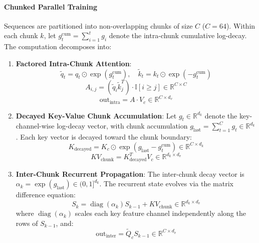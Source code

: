 \documentclass[10pt,twocolumn,letterpaper]{article}
\begin{document}
\paragraph{Chunked Parallel Training} Sequences are partitioned into non-overlapping chunks of size $C$ ($C=64$). Within each chunk $k$, let $g_t^{\text{cum}} = \sum_{i=1}^t g_i$ denote the intra-chunk cumulative log-decay. The computation decomposes into:
\begin{enumerate}
    \item \textbf{Factored Intra-Chunk Attention}:
    \begin{equation}
        \tilde{q}_t = q_t \odot \exp(g_t^{\text{cum}}), \quad \tilde{k}_t = k_t \odot \exp(-g_t^{\text{cum}})
    \end{equation}
    \begin{equation}
        A_{i, j} = (\tilde{q}_i \tilde{k}_j^T) \cdot \mathbb{I}[i \ge j] \in \mathbb{R}^{C \times C}
    \end{equation}
    \begin{equation}
        \text{out}_{\text{intra}} = A \cdot V_c \in \mathbb{R}^{C \times d_v}
    \end{equation}
    \item \textbf{Decayed Key-Value Chunk Accumulation}:
    Let $g_t \in \mathbb{R}^{d_k}$ denote the key-channel-wise log-decay vector, with chunk accumulation $g_{\text{last}} = \sum_{t=1}^C g_t \in \mathbb{R}^{d_k}$. Each key vector is decayed toward the chunk boundary:
    \begin{equation}
        K_{\text{decayed}} = K_c \odot \exp(g_{\text{last}} - g_t^{\text{cum}}) \in \mathbb{R}^{C \times d_k}
    \end{equation}
    \begin{equation}
        KV_{\text{chunk}} = K_{\text{decayed}}^T V_c \in \mathbb{R}^{d_k \times d_v}
    \end{equation}
    \item \textbf{Inter-Chunk Recurrent Propagation}:
    The inter-chunk decay vector is $\alpha_k = \exp(g_{\text{last}}) \in (0, 1]^{d_k}$. The recurrent state evolves via the matrix difference equation:
    \begin{equation}
        S_k = \operatorname{diag}(\alpha_k) S_{k-1} + KV_{\text{chunk}} \in \mathbb{R}^{d_k \times d_v} \label{eq:inter_chunk}
    \end{equation}
    where $\operatorname{diag}(\alpha_k)$ scales each key feature channel independently along the rows of $S_{k-1}$, and:
    \begin{equation}
        \text{out}_{\text{inter}} = \tilde{Q}_c S_{k-1} \in \mathbb{R}^{C \times d_v}
    \end{equation}
\end{enumerate}
\end{document}
